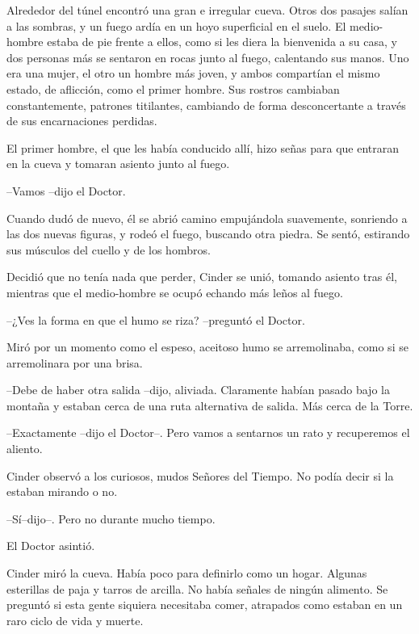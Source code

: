Alrededor del túnel encontró una gran e irregular cueva. Otros dos pasajes salían a las sombras, y un fuego ardía en un hoyo superficial en el suelo. El medio-hombre estaba de pie frente a ellos, como si les diera la bienvenida a su casa, y dos personas más se sentaron en rocas junto al fuego, calentando sus manos. Uno era una mujer, el otro un hombre más joven, y ambos compartían el mismo estado, de aflicción, como el primer hombre. Sus rostros cambiaban constantemente, patrones titilantes, cambiando de forma desconcertante a través de sus encarnaciones perdidas.

El primer hombre, el que les había conducido allí, hizo señas para que entraran en la cueva y tomaran asiento junto al fuego.



--Vamos --dijo el Doctor. 



Cuando dudó de nuevo, él se abrió camino empujándola suavemente, sonriendo a las dos nuevas figuras, y rodeó el fuego, buscando otra piedra. Se sentó, estirando sus músculos del cuello y de los hombros.

Decidió que no tenía nada que perder, Cinder se unió, tomando asiento tras él, mientras que el medio-hombre se ocupó echando más leños al fuego.



--¿Ves la forma en que el humo se riza? --preguntó el Doctor.



Miró por un momento como el espeso, aceitoso humo se arremolinaba, como si se arremolinara por una brisa. 



--Debe de haber otra salida --dijo, aliviada. Claramente habían pasado bajo la montaña y estaban cerca de una ruta alternativa de salida. Más cerca de la Torre.

--Exactamente --dijo el Doctor--. Pero vamos a sentarnos un rato y recuperemos el aliento.



Cinder observó a los curiosos, mudos Señores del Tiempo. No podía decir si la estaban mirando o no. 



--Sí--dijo--. Pero no durante mucho tiempo.



El Doctor asintió.

Cinder miró la cueva. Había poco para definirlo como un hogar. Algunas esterillas de paja y tarros de arcilla. No había señales de ningún alimento. Se preguntó si esta gente siquiera necesitaba comer, atrapados como estaban en un raro ciclo de vida y muerte.

